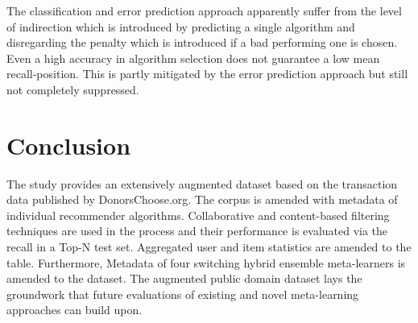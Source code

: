 \documentclass[runningheads]{llncs}
\begin{document}
The classification and error prediction approach apparently suffer from the level of indirection which is introduced by predicting a single algorithm and disregarding the penalty which is introduced if a bad performing one is chosen. Even a high accuracy in algorithm selection does not guarantee a low mean recall-position. This is partly mitigated by the error prediction approach but still not completely suppressed.

\section{Conclusion}
The study provides an extensively augmented dataset based on the transaction data published by DonorsChoose.org. The corpus is amended with metadata of individual recommender algorithms. Collaborative and content-based filtering techniques are used in the process and their performance is evaluated via the recall in a Top-N test set. Aggregated user and item statistics are amended to the table. Furthermore, Metadata of four switching hybrid ensemble meta-learners is amended to the dataset. The augmented public domain dataset lays the groundwork that future evaluations of existing and novel meta-learning approaches can build upon.

\begin{appendix}
	\printbibliography[heading=bibintoc]
\end{appendix}
\end{document}
